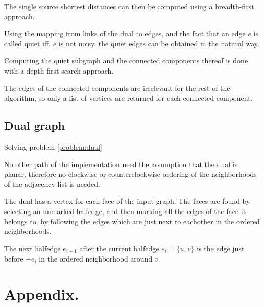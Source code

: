 \documentclass{article}
\begin{document}
		The single source shortest distances can then be computed using a breadth-first approach.

		Using the mapping from links of the dual to edges, and the fact that an edge $e$ is called quiet iff. $e$ is not noisy, the quiet edges can be obtained in the natural way.

		Computing the quiet subgraph and the connected components thereof is done with a depth-first search approach.

		The edges of the connected components are irrelevant for the rest of the algorithm, so only a list of vertices are returned for each connected component.


	\subsection{Dual graph}\label{impl:dual}

		Solving problem \ref{problem:dual}

		No other path of the implementation need the assumption that the dual is planar, therefore no clockwise or counterclockwise ordering of the neighborhoods of the adjacency list is needed.

		The dual has a vertex for each face of the input graph. The faces are found by selecting an unmarked halfedge, and then marking all the edges of the face it belongs to, by following the edges which are just next to eachother in the ordered neighborhoods.

		The next halfedge $e_{i+1}$ after the current halfedge $e_i = \{u, v\}$ is the edge just before $-e_i$ in the ordered neighborhood around $v$.



\section{Appendix.}
	
\end{document}
